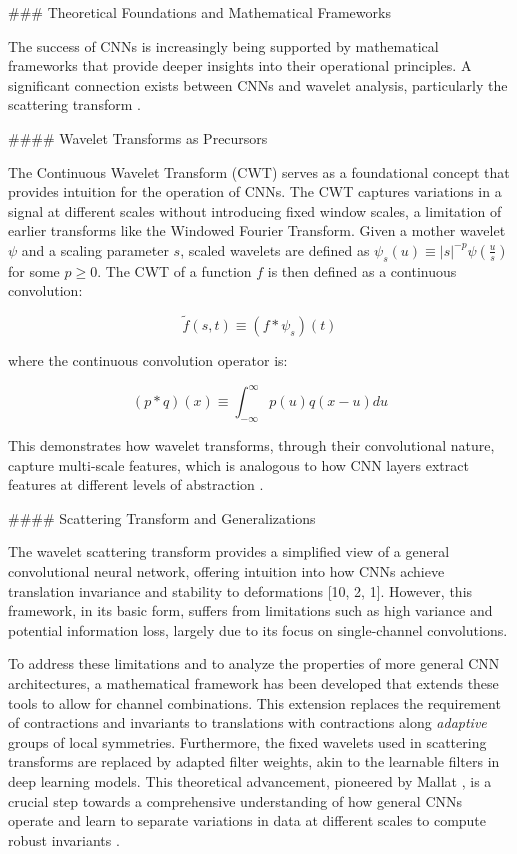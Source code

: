 \documentclass{article}
\begin{document}
\#\#\# Theoretical Foundations and Mathematical Frameworks

The success of CNNs is increasingly being supported by mathematical frameworks that provide deeper insights into their operational principles. A significant connection exists between CNNs and wavelet analysis, particularly the scattering transform \cite{10}.

\#\#\#\# Wavelet Transforms as Precursors

The Continuous Wavelet Transform (CWT) serves as a foundational concept that provides intuition for the operation of CNNs. The CWT captures variations in a signal at different scales without introducing fixed window scales, a limitation of earlier transforms like the Windowed Fourier Transform. Given a mother wavelet $\psi$ and a scaling parameter $s$, scaled wavelets are defined as $\psi_s(u) \equiv |s|^{-p}\psi\left(\frac{u}{s}\right)$ for some $p \geq 0$. The CWT of a function $f$ is then defined as a continuous convolution:

$$ \tilde{f}(s, t) \equiv (f \ast \psi_s)(t) $$

where the continuous convolution operator is:

$$ (p \ast q)(x) \equiv \int_{-\infty}^{\infty} p(u)q(x - u)du $$

This demonstrates how wavelet transforms, through their convolutional nature, capture multi-scale features, which is analogous to how CNN layers extract features at different levels of abstraction \cite{10}.

\#\#\#\# Scattering Transform and Generalizations

The wavelet scattering transform provides a simplified view of a general convolutional neural network, offering intuition into how CNNs achieve translation invariance and stability to deformations [10, 2, 1]. However, this framework, in its basic form, suffers from limitations such as high variance and potential information loss, largely due to its focus on single-channel convolutions.

To address these limitations and to analyze the properties of more general CNN architectures, a mathematical framework has been developed that extends these tools to allow for channel combinations. This extension replaces the requirement of contractions and invariants to translations with contractions along \textit{adaptive} groups of local symmetries. Furthermore, the fixed wavelets used in scattering transforms are replaced by adapted filter weights, akin to the learnable filters in deep learning models. This theoretical advancement, pioneered by Mallat \cite{10}, is a crucial step towards a comprehensive understanding of how general CNNs operate and learn to separate variations in data at different scales to compute robust invariants \cite{10}.
\end{document}
